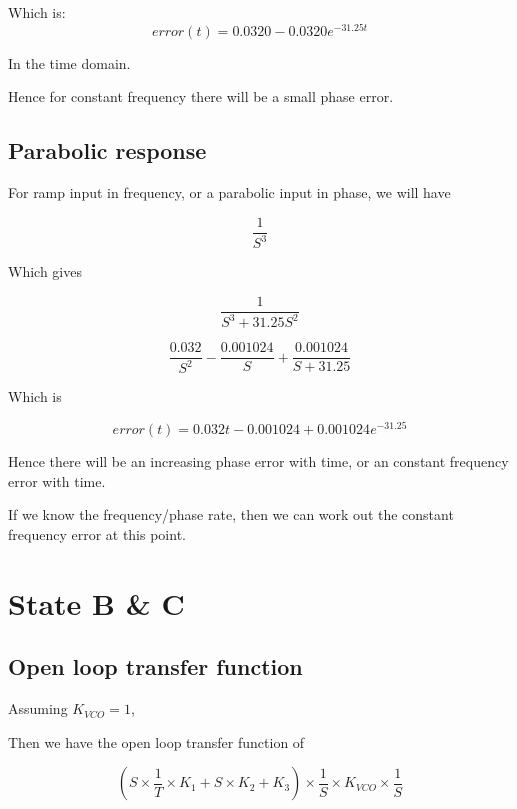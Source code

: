 Which is: 
\begin{equation}
error(t) =  0.0320 -0.0320e^{-31.25t}
\end{equation}

In the time domain.

Hence for constant frequency there will be a small phase error.

\subsection{Parabolic response}
For ramp input in frequency, or a parabolic input in phase, we will have 

\begin{equation}
\frac{1}{S^3}
\end{equation}

Which gives 

\begin{equation}
\frac{1}{S^3+31.25S^2}
\end{equation}

\begin{equation}
\frac{0.032}{S^2} - \frac{0.001024}{S} + \frac{0.001024}{S+31.25}
\end{equation}

Which is 

\begin{equation}
error(t) =  0.032t - 0.001024 + 0.001024 e^{-31.25}
\end{equation}

Hence there will be an increasing phase error with time, or an constant frequency error with time. 

If we know the frequency/phase rate, then we can work out the constant frequency error at this point.

\section{State B \& C}



\subsection{Open loop transfer function}

Assuming $K_{VCO} = 1$, 

Then we have the open loop transfer function of 

\begin{equation}
(S \times \frac{1}{T} \times K_1 + S \times K_2 +K_3 ) \times \frac{1}{S} \times K_{VCO} \times \frac{1}{S}
\end{equation}


